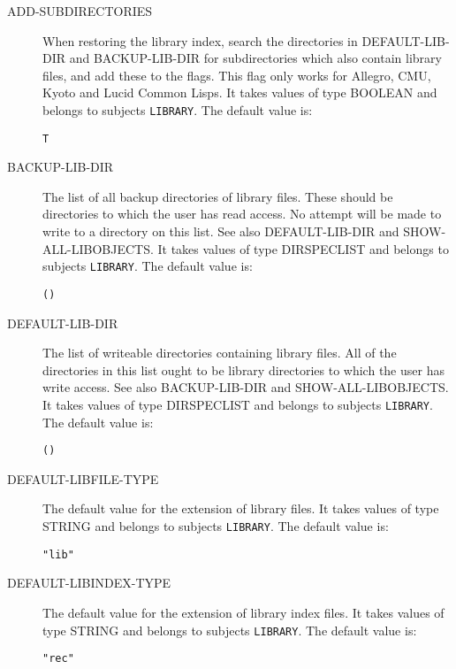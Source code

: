 \begin{description} 
\item[ADD-SUBDIRECTORIES]  
When restoring the library index, search the directories in 
DEFAULT-LIB-DIR and BACKUP-LIB-DIR for subdirectories which also contain 
library files, and add these to the flags. This flag only works for Allegro,
CMU, Kyoto and Lucid Common Lisps.
It takes values of type BOOLEAN and belongs to subjects \texttt{LIBRARY}.  The default value is: \begin{lstlisting}
T
\end{lstlisting}

\item[BACKUP-LIB-DIR]  
The list of all backup directories of library files.
These should be directories to which the user has read access.
No attempt will be made to write to a directory on this list.
See also DEFAULT-LIB-DIR and SHOW-ALL-LIBOBJECTS.
It takes values of type DIRSPECLIST and belongs to subjects \texttt{LIBRARY}.  The default value is: \begin{lstlisting}
()
\end{lstlisting}

\item[DEFAULT-LIB-DIR]  
The list of writeable directories containing 
library files. All of the directories in this list ought to be 
library directories to which the user has write access.
See also BACKUP-LIB-DIR and SHOW-ALL-LIBOBJECTS.
It takes values of type DIRSPECLIST and belongs to subjects \texttt{LIBRARY}.  The default value is: \begin{lstlisting}
()
\end{lstlisting}

\item[DEFAULT-LIBFILE-TYPE]  
The default value for the extension of library files.
It takes values of type STRING and belongs to subjects \texttt{LIBRARY}.  The default value is: \begin{lstlisting}
"lib"
\end{lstlisting}

\item[DEFAULT-LIBINDEX-TYPE]  
The default value for the extension of library index files.
It takes values of type STRING and belongs to subjects \texttt{LIBRARY}.  The default value is: \begin{lstlisting}
"rec"
\end{lstlisting}


\end{description}
